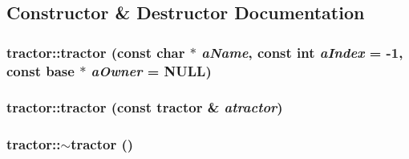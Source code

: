 \subsection{Constructor \& Destructor Documentation}
\hypertarget{classtractor_aa930d6242e8c2d21d3c1f418d1a61547}{
\subsubsection[{tractor}]{\setlength{\rightskip}{0pt plus 5cm}tractor::tractor (const char $\ast$ {\em aName}, \/  const int {\em aIndex} = {\ttfamily -\/1}, \/  const {\bf base} $\ast$ {\em aOwner} = {\ttfamily NULL})}}
\label{classtractor_aa930d6242e8c2d21d3c1f418d1a61547}
\hypertarget{classtractor_a9eaef30f5127f77654bb0ac181353b8c}{
\subsubsection[{tractor}]{\setlength{\rightskip}{0pt plus 5cm}tractor::tractor (const {\bf tractor} \& {\em atractor})}}
\label{classtractor_a9eaef30f5127f77654bb0ac181353b8c}
\hypertarget{classtractor_a6e8c0530e0bf6ae8bf14aa2ab9f1a9ad}{
\subsubsection[{$\sim$tractor}]{\setlength{\rightskip}{0pt plus 5cm}tractor::$\sim$tractor ()}}
\label{classtractor_a6e8c0530e0bf6ae8bf14aa2ab9f1a9ad}


